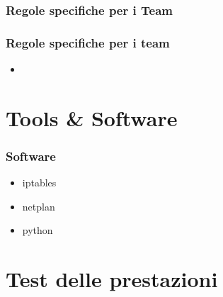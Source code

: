 \documentclass{beamer}
\begin{document}
\subsubsection{Regole specifiche per i Team}
\begin{frame}
    \frametitle{Regole specifiche per i team}
    \begin{itemize}
        \item 
    \end{itemize}

\end{frame}


\section{Tools \& Software}
\begin{frame}
    \frametitle{Software}
    \begin{itemize}
        \item <1-> iptables
        \item <1-> netplan
        \item <1-> python
    \end{itemize}
     
\end{frame}

\section{Test delle prestazioni}
\begin{frame}
    \frametitle{}

    

\end{frame}
\end{document}
